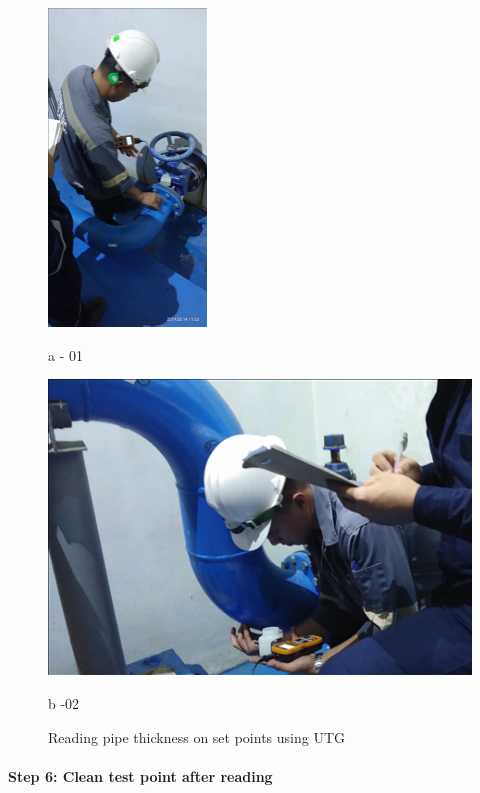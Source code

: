 \begin{figure}
	\begin{minipage}[b]{0.4\linewidth}
		\centering
		\includegraphics[scale=1.5]{figures/ch02_utgreading1}
		\caption*{a - 01}
		\end{minipage}
	\hspace{0.05cm}
	\begin{minipage}[b]{0.4\linewidth}
		\centering
		\includegraphics[width=\textwidth]{figures/ch02_utgreading2}
		\caption*{b -02}
	\end{minipage}
\caption{Reading pipe thickness on set points using UTG}
\label{ch02_utgreading}
\end{figure}

\paragraph{Step 6: Clean test point after reading}

